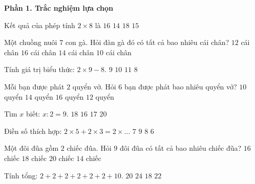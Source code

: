 \textbf{Phần 1. Trắc nghiệm lựa chọn}

\begin{ex} %
Kết quả của phép tính $2 \times 8$ là
\choice
{\True $16$}
{$14$}
{$18$}
{$15$}
\end{ex}

\begin{ex} %
Một chuồng nuôi $7$ con gà. Hỏi đàn gà đó có tất cả bao nhiêu cái chân?
\choice
{$12$ cái chân}
{$16$ cái chân}
{\True $14$ cái chân}
{$10$ cái chân}
\end{ex}

\begin{ex} %
Tính giá trị biểu thức: $2 \times 9 - 8$.
\choice
{$9$}
{\True $10$}
{$11$}
{$8$}
\end{ex}

\begin{ex} %
Mỗi bạn được phát $2$ quyển vở. Hỏi $6$ bạn được phát bao nhiêu quyển vở?
\choice
{$10$ quyển}
{$14$ quyển}
{$16$ quyển}
{\True $12$ quyển}
\end{ex}

\begin{ex} %
Tìm $x$ biết: $x : 2 = 9$.
\choice
{\True $18$}
{$16$}
{$17$}
{$20$}
\end{ex}

\begin{ex} %
Điền số thích hợp: $2 \times 5 + 2 \times 3 = 2 \times \dots$
\choice
{$7$}
{$9$}
{\True $8$}
{$6$}
\end{ex}

\begin{ex} %
Một đôi đũa gồm $2$ chiếc đũa. Hỏi $9$ đôi đũa có tất cả bao nhiêu chiếc đũa?
\choice
{$16$ chiếc}
{\True $18$ chiếc}
{$20$ chiếc}
{$14$ chiếc}
\end{ex}

\begin{ex} %
Tính tổng: $2 + 2 + 2 + 2 + 2 + 2 + 10$.
\choice
{$20$}
{$24$}
{$18$}
{\True $22$}
\end{ex}

